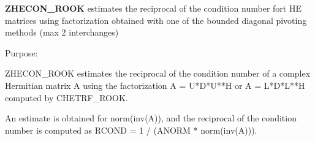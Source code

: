 {\bfseries Z\+H\+E\+C\+O\+N\+\_\+\+R\+O\+O\+K} estimates the reciprocal of the condition number fort H\+E matrices using factorization obtained with one of the bounded diagonal pivoting methods (max 2 interchanges) 

 \begin{DoxyParagraph}{Purpose\+: }
\begin{DoxyVerb} ZHECON_ROOK estimates the reciprocal of the condition number of a complex
 Hermitian matrix A using the factorization A = U*D*U**H or
 A = L*D*L**H computed by CHETRF_ROOK.

 An estimate is obtained for norm(inv(A)), and the reciprocal of the
 condition number is computed as RCOND = 1 / (ANORM * norm(inv(A))).\end{DoxyVerb}
 
\end{DoxyParagraph}

